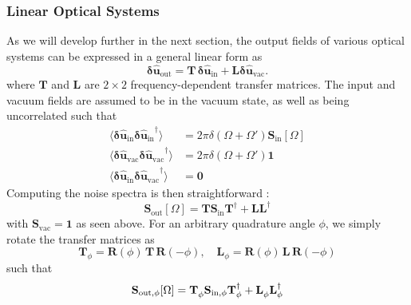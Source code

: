 \subsubsection{Linear Optical Systems}
As we will develop further in the next section, the output fields of various optical systems can be expressed in a general linear form as
\begin{equation}
\mathbf{\delta \hat{u}_{\mathrm{out}}}
=
\mathbf{T}\, \mathbf{\delta \hat{u}_{\mathrm{in}}}
+ \mathbf{L}  \mathbf{\delta \hat{u}_{\mathrm{vac}}}.
\end{equation}
where $\mathbf{T}$ and $\mathbf{L}$ are $2\times 2$ frequency-dependent transfer matrices. The input and vacuum fields are assumed to be in the vacuum state, as well as being uncorrelated such that 
\begin{equation}
  \begin{split}
    \langle \mathbf{\delta \hat{u}_{\mathrm{in}}}  \mathbf{\delta \hat{u}_{\mathrm{in}}}^{\dagger} \rangle & = 2\pi \delta(\Omega+\Omega')\mathbf{S}_{\mathrm{in}}[\Omega]  \\
    \langle \mathbf{\delta \hat{u}_{\mathrm{vac}}}  \mathbf{\delta \hat{u}_{\mathrm{vac}}}^{\dagger} \rangle &=  2\pi \delta(\Omega+\Omega')\mathbf{1}  \\
    \langle \mathbf{\delta \hat{u}_{\mathrm{in}}}  \mathbf{\delta \hat{u}_{\mathrm{vac}}}^{\dagger} \rangle &= \mathbf{0}
  \end{split}
\end{equation}
Computing the noise spectra is then straightforward : 
\begin{equation}
  \mathbf{S}_{\mathrm{out}}[\Omega] = \mathbf{T} \mathbf{S}_{\mathrm{in}}\mathbf{T}^{\dagger} + \mathbf{L} \mathbf{L}^{\dagger} 
\end{equation}
with $\mathbf{S}_{\mathrm{vac}} = \mathbf{1}$ as seen above. For an arbitrary quadrature angle $\phi$, we simply rotate the transfer matrices as
\begin{equation*}
  \mathbf{T}_\phi = \mathbf{R}(\phi) \, \mathbf{T} \, \mathbf{R}(-\phi), \quad
  \mathbf{L}_\phi = \mathbf{R}(\phi) \, \mathbf{L} \, \mathbf{R}(-\phi)
\end{equation*}
such that
\begin{equation}
  \mathbf{S}_{\mathrm{out},\phi}[\Omega] = \mathbf{T}^{\vphantom{\dagger}}_\phi \mathbf{S}_{\mathrm{in},\phi}\mathbf{T}_\phi^{\dagger} + \mathbf{L}^{\vphantom{\dagger}}_\phi \mathbf{L}_\phi^{\dagger}
\end{equation}


